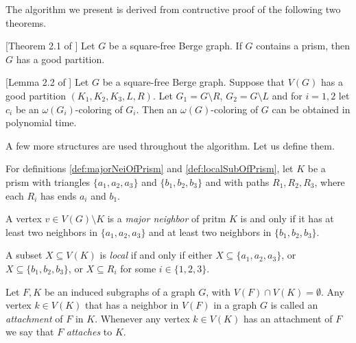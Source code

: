 The algorithm we present is derived from contructive proof of the following two theorems.

\begin{theorem}{}[Theorem 2.1 of \cite{coloringSquareFree}]
  Let $G$ be a square-free Berge graph. If $G$ contains a prism, then $G$ has a good partition.
\end{theorem}

\begin{theorem}{}[Lemma 2.2 of \cite{coloringSquareFree}]
  Let $G$ be a square-free Berge graph. Suppose that $V(G)$ has a good partition $(K_1, K_2, K_3, L, R)$. Let $G_1 = G \setminus R$, $G_2 = G \setminus L$ and for $i = 1,2$ let $c_i$ be an $\omega(G_i)$-coloring of $G_i$. Then an $\omega(G)$-coloring of $G$ can be obtained in polynomial time.
\end{theorem}

A few more structures are used throughout the algorithm. Let us define them.

For definitions \ref{def:majorNeiOfPrism} and \ref{def:localSubOfPrism}, let $K$ be a prism with triangles $\{a_1, a_2, a_3\}$ and $\{b_1, b_2, b_3\}$ and with paths $R_1, R_2, R_3$, where each $R_i$ has ends $a_i$ and $b_1$.

\begin{defnTwo}
  A vertex $v \in V(G) \setminus K$ is a \emph{major neighbor} of pritm $K$ is and only if it has at least two neighbors in $\{a_1, a_2, a_3\}$ and at least two neighbors in $\{b_1, b_2, b_3\}$.
  \label{def:majorNeiOfPrism}
\end{defnTwo}

\begin{defnTwo}
  A subset $X \subseteq V(K)$ is \emph{local} if and only if either $X \subseteq \{a_1, a_2, a_3\}$, or $X \subseteq \{b_1, b_2, b_3\}$, or $X \subseteq R_i$ for some $i \in \{1, 2, 3\}$.
  \label{def:localSubOfPrism}
\end{defnTwo}

\begin{defnTwo}[attachment]
  Let $F, K$ be an induced subgraphs of a graph $G$, with $V(F) \cap V(K) = \emptyset$. Any vertex $k \in V(K)$ that has a neighbor in $V(F)$ in a graph $G$ is called an \emph{attachment} of $F$ in $K$. Whenever any vertex $k \in V(K)$ has an attachment of $F$ we say that $F$ \emph{attaches} to $K$.
\end{defnTwo}

